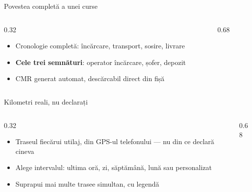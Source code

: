 \documentclass[aspectratio=169,10pt]{beamer}
\begin{document}
\begin{frame}{Povestea completă a unei curse}
  \begin{columns}[T]
    \begin{column}{0.32\linewidth}
      \vspace{0.3cm}
      \begin{itemize}
        \item Cronologie completă: încărcare, transport, sosire, livrare
        \item \textbf{Cele trei semnături}: operator încărcare, șofer, depozit
        \item CMR generat automat, descărcabil direct din fișă
      \end{itemize}
    \end{column}
    \begin{column}{0.68\linewidth}
    \end{column}
  \end{columns}
\end{frame}

\begin{frame}{Kilometri reali, nu declarați}
  \begin{columns}[T]
    \begin{column}{0.32\linewidth}
      \vspace{0.3cm}
      \begin{itemize}
        \item Traseul fiecărui utilaj, din GPS-ul telefonului — nu din ce declară cineva
        \item Alege intervalul: ultima oră, zi, săptămână, lună sau personalizat
        \item Suprapui mai multe trasee simultan, cu legendă
      \end{itemize}
    \end{column}
    \begin{column}{0.68\linewidth}
    \end{column}
  \end{columns}
\end{frame}
\end{document}
